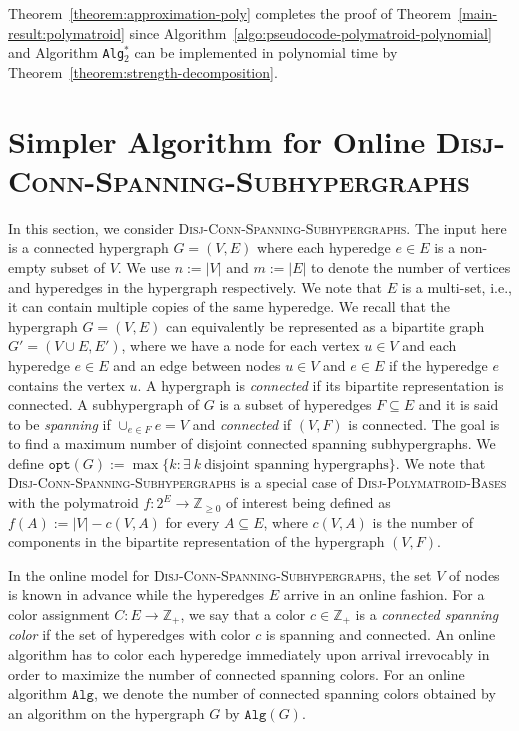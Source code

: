 \documentclass[11pt]{article}
\theoremstyle{definition}
\newcommand{\Z}{\mathbb{Z}}
\newcommand{\DPB}{\textsc{Disj-Polymatroid-Bases}\xspace}
\newcommand{\DCSS}{\textsc{Disj-Conn-Spanning-Subhypergraphs}\xspace}
\newcommand{\opt}{\texttt{opt}}
\begin{document}
Theorem~\ref{theorem:approximation-poly} completes the proof of Theorem~\ref{main-result:polymatroid} since Algorithm~\ref{algo:pseudocode-polymatroid-polynomial} and Algorithm \texttt{Alg$_2^*$} can be implemented in polynomial time by Theorem~\ref{theorem:strength-decomposition}. \section{Simpler Algorithm for Online \DCSS}\label{section:hypergraph-faster-algo}
In this section, we consider \DCSS. The input here is a connected hypergraph $G=(V, E)$ where each hyperedge $e\in E$ is a non-empty subset of $V$. We use $n:=|V|$ and $m:=|E|$ to denote the number of vertices and hyperedges in the hypergraph respectively.
We note that $E$ is a multi-set, i.e., it can contain multiple copies of the same hyperedge. We recall that the hypergraph $G=(V, E)$ can equivalently be represented as a bipartite graph $G'=(V\cup E, E')$, where we have a node for each vertex $u\in V$ and each hyperedge $e\in E$ and an edge between nodes $u\in V$ and $e\in E$ if the hyperedge $e$ contains the vertex $u$. A hypergraph is \emph{connected} if its bipartite representation is connected. A subhypergraph of $G$ is a subset of hyperedges $F\subseteq E$ and it is said to be \emph{spanning} if $\cup_{e\in F}e=V$ and \emph{connected} if $(V, F)$ is connected.
The goal is to find a maximum number of disjoint connected spanning subhypergraphs. We define $\opt(G):=\max\{k: \exists \ k \ \text{disjoint spanning hypergraphs}\}$. We note that \DCSS is a special case of \DPB with the polymatroid $f:2^E\rightarrow \Z_{\ge 0}$ of interest being defined as $f(A):=|V|-c(V,A)$ for every $A\subseteq E$, where $c(V,A)$ is the number of components in the bipartite representation of the hypergraph $(V,F)$.

In the online model for \DCSS, the set $V$ of nodes is known in advance while the hyperedges $E$ arrive in an online fashion. For a color assignment $C: E \rightarrow \mathbb{Z}_+$, we say that a color $c\in \Z_+$ is a \emph{connected spanning color} if the set  of hyperedges with color $c$ is spanning and connected. An online algorithm has to color each hyperedge immediately upon arrival irrevocably in order to maximize the number of connected spanning colors. For an online algorithm $\texttt{Alg}$, we denote the number of connected spanning colors obtained by an algorithm on the hypergraph $G$ by $\texttt{Alg}(G)$. 
\end{document}

